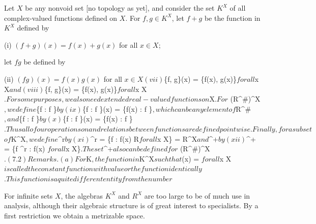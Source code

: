 Let $X$ be any nonvoid set [no topology as yet], and consider the set $K^X$ of all complex-valued functions defined on $X$. For $f, g \in K^X$, let $f + g$ be the function in $K^X$ defined by

(i) $(f + g)(x) = f(x) + g(x)$ for all $x \in X$;

let $fg$ be defined by

(ii) $(fg)(x) = f(x)g(x)$ for all $x \in X

(vii) $\max\{f, g\}(x) = \max\{f(x), g(x)\}$ for all $x \in X$
and
(viii) $\min\{f, g\}(x) = \min\{f(x), g(x)\}$ for all $x \in X$.

For some purposes, we also need extended real-valued functions on $X$. For $ \subset (R^{\#})^X$, we define $\sup\{f : f \in {}\}$ by
(ix) $\sup\{f : f \in {}\}(x) = \sup\{f(x) : f \in {}\}$, which can be any element of $R^{\#}$, and $\inf\{f : f \in {}\}$ by
(x) $\inf\{f : f \in {}\}(x) = \inf\{f(x) : f \in {}\}$.

Thus all of our operations on and relations between functions are defined pointwise.

Finally, for a subset $$ of $K^X$, we define $^r$ by
(xi) $^r = \{f \in {} : f(x) \in R$ for all $x \in X\} =  \cap R^X$
and $^+$ by
(xii) $^+ = \{f \in {}^r : f(x) $ for all $x \in X\}$.

The set $^+$ also can be defined for $ \subset (R^{\#})^X$.

(7.2) Remarks. (a) For $\alpha \in K$, the function $\psi$ in $K^X$ such that $\psi(x) = \alpha$ for all $x \in X$ is called the constant function with value $\alpha$ or the function identically $\alpha$. This function is a quite different entity from the number $\

For infinite sets $X$, the algebras $K^X$ and $R^X$ are too large to be of much use in analysis, although their algebraic structure is of great interest to specialists. By a first restriction we obtain a metrizable space.